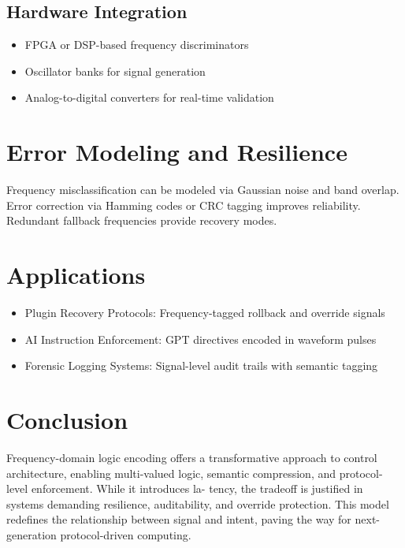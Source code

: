 \documentclass[11pt]{article}
\begin{document}
\subsection{Hardware Integration}
\begin{itemize}
  \item FPGA or DSP-based frequency discriminators
  \item Oscillator banks for signal generation
  \item Analog-to-digital converters for real-time validation
\end{itemize}

\section{Error Modeling and Resilience}
Frequency misclassification can be modeled via Gaussian noise and band overlap. Error correction via
Hamming codes or CRC tagging improves reliability. Redundant fallback frequencies provide recovery
modes.

\section{Applications}
\begin{itemize}
  \item Plugin Recovery Protocols: Frequency-tagged rollback and override signals
  \item AI Instruction Enforcement: GPT directives encoded in waveform pulses
  \item Forensic Logging Systems: Signal-level audit trails with semantic tagging
\end{itemize}

\section{Conclusion}
Frequency-domain logic encoding offers a transformative approach to control architecture, enabling
multi-valued logic, semantic compression, and protocol-level enforcement. While it introduces la-
tency, the tradeoff is justified in systems demanding resilience, auditability, and override protection.
This model redefines the relationship between signal and intent, paving the way for next-generation
protocol-driven computing.



\end{document}
